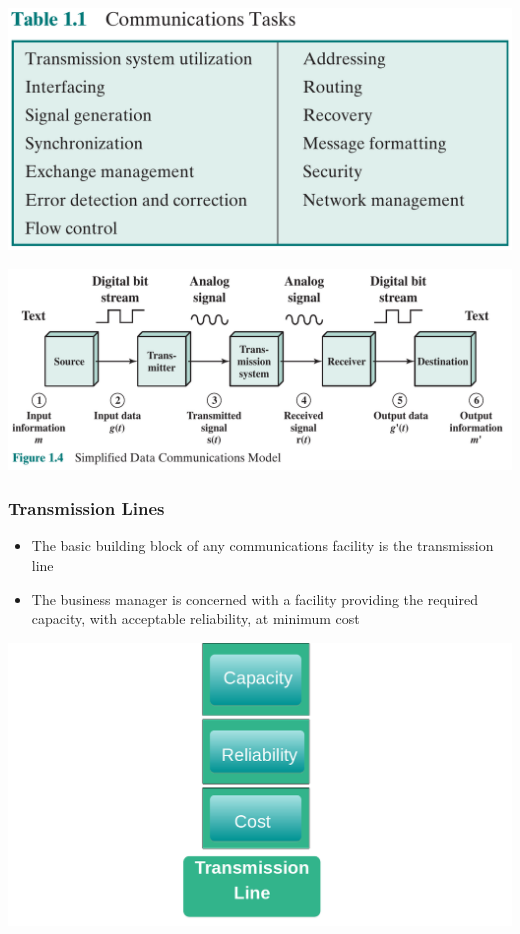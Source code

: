 \documentclass[pdflatex,compress]{beamer}
\begin{document}
\begin{frame}
	\begin{center}
		\includegraphics[width=\linewidth]{img/img07}
	\end{center}
\end{frame}

\begin{frame}
	\begin{center}
		\includegraphics[width=\linewidth]{img/img08}
	\end{center}
\end{frame}

\begin{frame}
	\frametitle{Transmission Lines}
	\begin{multicols}{2}
		\begin{itemize}
			\item The basic building block of any communications facility is the transmission line
			\item The business manager is concerned with a facility providing the required capacity, with acceptable reliability, at minimum cost
		\end{itemize}		
		\columnbreak
			\includegraphics[width=1.5\linewidth]{img/img09}
	\end{multicols}
\end{frame}
\end{document}
